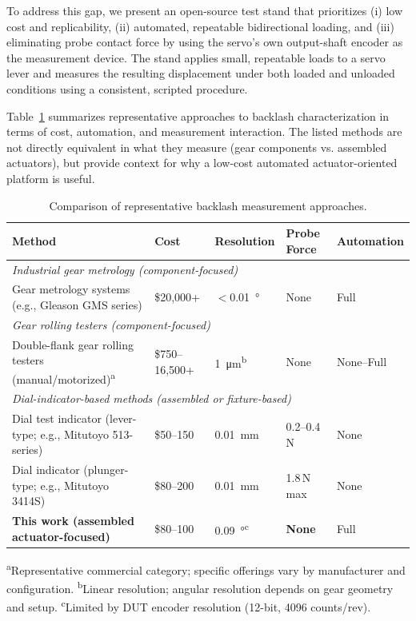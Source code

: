 \documentclass[11pt,letterpaper]{article}
\begin{document}
To address this gap, we present an open-source test stand that prioritizes (i) low cost and
replicability, (ii) automated, repeatable bidirectional loading, and (iii) eliminating probe contact
force by using the servo’s own output-shaft encoder as the measurement device. The stand
applies small, repeatable loads to a servo lever and measures the resulting displacement under
both loaded and unloaded conditions using a consistent, scripted procedure.

Table~\ref{tab:comparison} summarizes representative approaches to backlash characterization in terms of cost, automation, and measurement interaction. The listed methods are not directly equivalent in what they measure (gear components vs. assembled actuators), but provide context for why a low-cost automated actuator-oriented platform is useful.

\begin{table}[H]
\centering
\caption{Comparison of representative backlash measurement approaches.}
\label{tab:comparison}
\small
\begin{tabular}{lllll}
\toprule
\textbf{Method} & \textbf{Cost} & \textbf{Resolution} & \textbf{Probe Force} & \textbf{Automation} \\
\midrule
\multicolumn{5}{l}{\textit{Industrial gear metrology (component-focused)}} \\
\quad Gear metrology systems (e.g., Gleason GMS series) \cite{gleason_gms} & \$20,000+ & $<$\SI{0.01}{\degree} & None & Full \\
\midrule
\multicolumn{5}{l}{\textit{Gear rolling testers (component-focused)}} \\
\quad Double-flank gear rolling testers (manual/motorized)\textsuperscript{a} \cite{kudale_gear_tester} & \$750--16,500+ & \SI{1}{\micro\meter}\textsuperscript{b} & None & None--Full \\
\midrule
\multicolumn{5}{l}{\textit{Dial-indicator-based methods (assembled or fixture-based)}} \\
\quad Dial test indicator (lever-type; e.g., Mitutoyo 513-series) \cite{mitutoyo_513} & \$50--150 & \SI{0.01}{\milli\meter} & 0.2--0.4\,N & None \\
\quad Dial indicator (plunger-type; e.g., Mitutoyo 3414S) \cite{mitutoyo_3414s} & \$80--200 & \SI{0.01}{\milli\meter} & 1.8\,N max & None \\
\midrule
\textbf{This work (assembled actuator-focused)} & \$80--100 & \SI{0.09}{\degree}\textsuperscript{c} & \textbf{None} & Full \\
\bottomrule
\end{tabular}
\vspace{0.5em}

\footnotesize{
\textsuperscript{a}Representative commercial category; specific offerings vary by manufacturer and configuration. 
\textsuperscript{b}Linear resolution; angular resolution depends on gear geometry and setup. 
\textsuperscript{c}Limited by DUT encoder resolution (12-bit, 4096 counts/rev).
}
\end{table}
\end{document}

